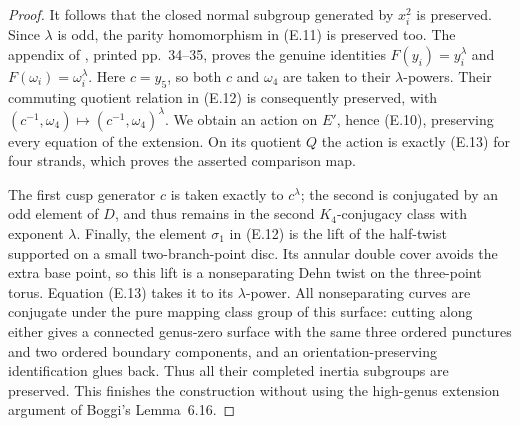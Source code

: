 \begin{proof}
It follows that the closed normal subgroup generated by $x_i^2$
is preserved.  Since $\lambda$ is odd, the parity homomorphism in
(E.11) is preserved too.  The appendix of \cite{ET_HS2000},
printed pp.~34--35, proves the genuine identities
$F(y_i)=y_i^\lambda$ and $F(\omega_i)=\omega_i^\lambda$.
Here $c=y_5$, so both $c$ and $\omega_4$ are taken to their
$\lambda$-powers.  Their commuting quotient relation in (E.12)
is consequently preserved, with
$(c^{-1},\omega_4)\mapsto(c^{-1},\omega_4)^\lambda$.
We obtain an action on $E'$, hence (E.10), preserving every equation
of the extension.  On its quotient $Q$ the action is exactly (E.13)
for four strands, which proves the asserted comparison map.

The first cusp generator $c$ is taken exactly to $c^\lambda$;
the second is conjugated by an odd element of $D$, and thus remains
in the second $K_4$-conjugacy class with exponent $\lambda$.
Finally, the element $\sigma_1$ in (E.12) is the lift of the
half-twist supported on a small two-branch-point disc.  Its annular
double cover avoids the extra base point, so this lift is a
nonseparating Dehn twist on the three-point torus.  Equation (E.13)
takes it to its $\lambda$-power.  All nonseparating curves are
conjugate under the pure mapping class group of this surface:
cutting along either gives a connected genus-zero surface with the
same three ordered punctures and two ordered boundary components,
and an orientation-preserving identification glues back.  Thus all
their completed inertia subgroups are preserved.  This finishes
the construction without using the high-genus extension argument
of Boggi's Lemma~6.16.
\end{proof}

